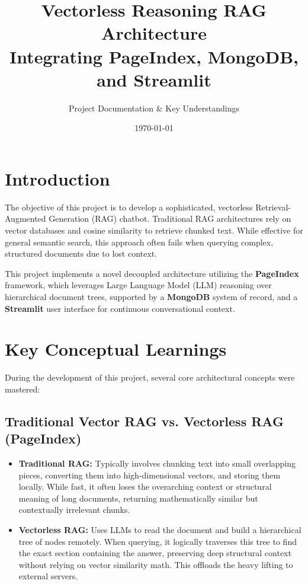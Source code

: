 \documentclass[12pt,a4paper]{article}
\title{\textbf{Vectorless Reasoning RAG Architecture}\\ \large Integrating PageIndex, MongoDB, and Streamlit}
\author{Project Documentation \& Key Understandings}
\date{\today}
\begin{document}
\maketitle
\tableofcontents
\newpage

\section{Introduction}
The objective of this project is to develop a sophisticated, vectorless Retrieval-Augmented Generation (RAG) chatbot. Traditional RAG architectures rely on vector databases and cosine similarity to retrieve chunked text. While effective for general semantic search, this approach often fails when querying complex, structured documents due to lost context. 

This project implements a novel decoupled architecture utilizing the \textbf{PageIndex} framework, which leverages Large Language Model (LLM) reasoning over hierarchical document trees, supported by a \textbf{MongoDB} system of record, and a \textbf{Streamlit} user interface for continuous conversational context.

\section{Key Conceptual Learnings}
During the development of this project, several core architectural concepts were mastered:

\subsection{Traditional Vector RAG vs. Vectorless RAG (PageIndex)}
\begin{itemize}
    \item \textbf{Traditional RAG:} Typically involves chunking text into small overlapping pieces, converting them into high-dimensional vectors, and storing them locally. While fast, it often loses the overarching context or structural meaning of long documents, returning mathematically similar but contextually irrelevant chunks.
    \item \textbf{Vectorless RAG:} Uses LLMs to read the document and build a hierarchical tree of nodes remotely. When querying, it logically traverses this tree to find the exact section containing the answer, preserving deep structural context without relying on vector similarity math. This offloads the heavy lifting to external servers.
\end{itemize}
\end{document}
